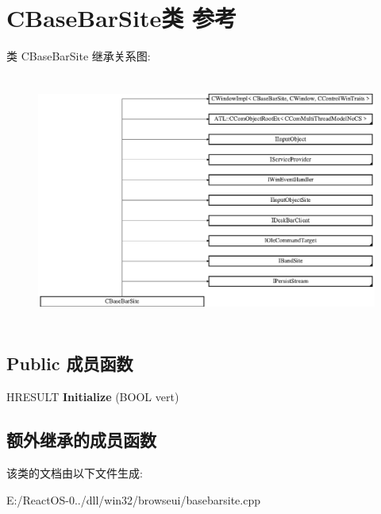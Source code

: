 \hypertarget{class_c_base_bar_site}{}\section{C\+Base\+Bar\+Site类 参考}
\label{class_c_base_bar_site}
类 C\+Base\+Bar\+Site 继承关系图\+:\begin{figure}[H]
\begin{center}
\leavevmode
\includegraphics[height=8.324325cm]{class_c_base_bar_site}
\end{center}
\end{figure}
\subsection*{Public 成员函数}
\begin{DoxyCompactItemize}
\item 
\mbox{\label{class_c_base_bar_site_a3da40c599c5845e9a7ed2276a7b4d3ea}} 
H\+R\+E\+S\+U\+LT {\bfseries Initialize} (B\+O\+OL vert)
\end{DoxyCompactItemize}
\subsection*{额外继承的成员函数}


该类的文档由以下文件生成\+:\begin{DoxyCompactItemize}
\item 
E\+:/\+React\+O\+S-\/0../dll/win32/browseui/basebarsite.\+cpp\end{DoxyCompactItemize}
